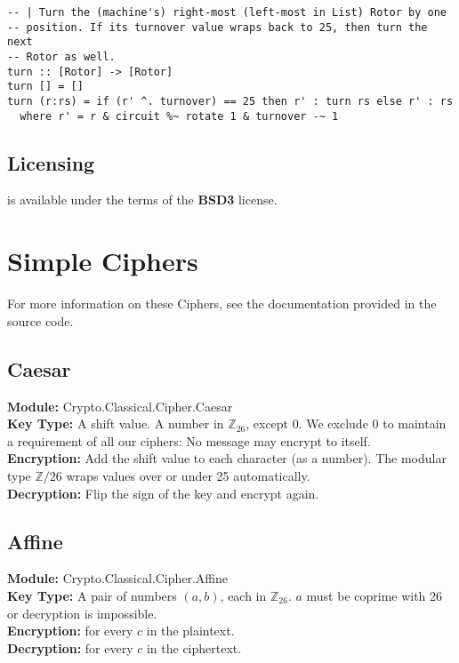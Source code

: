 \documentclass{article}
\begin{document}
\begin{lstlisting}
-- | Turn the (machine's) right-most (left-most in List) Rotor by one
-- position. If its turnover value wraps back to 25, then turn the next
-- Rotor as well.
turn :: [Rotor] -> [Rotor]
turn [] = []
turn (r:rs) = if (r' ^. turnover) == 25 then r' : turn rs else r' : rs
  where r' = r & circuit %~ rotate 1 & turnover -~ 1
\end{lstlisting}

\subsection{Licensing}
 is available under the terms of the \textbf{BSD3}
license.


\section{Simple Ciphers}
For more information on these Ciphers, see the documentation provided
in the source code.

\subsection{Caesar}
\textbf{Module:} Crypto.Classical.Cipher.Caesar\\
\textbf{Key Type:} A shift value.
A number in $\mathbb{Z}_{26}$, except 0. We exclude
0 to maintain a requirement of all our ciphers: No message may encrypt
to itself.\\
\textbf{Encryption:} Add the shift value to each character (as a number).
The modular type $\mathbb{Z}/26$ wraps values over or under 25 automatically.\\
\textbf{Decryption:} Flip the sign of the key and encrypt again.

\subsection{Affine}
\textbf{Module:} Crypto.Classical.Cipher.Affine\\
\textbf{Key Type:} A pair of numbers $(a,b)$, each in $\mathbb{Z}_{26}$. $a$
must be coprime with 26 or decryption is impossible.\\
\textbf{Encryption:}  for every $c$ in the plaintext.\\
\textbf{Decryption:}  for every $c$
in the ciphertext.
\end{document}
